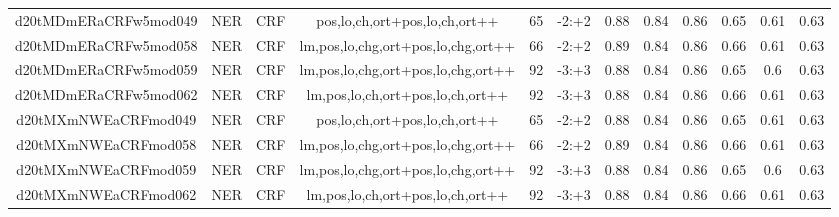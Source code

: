 \documentclass[a4paper]{article}
\begin{document}
\begin{landscape}
\begin{center}
\begin{tabular}{ |c|c|c|c|c|c|c|c|c|c|c|c|}
 	
 
 	
 		
 		\small{ d20tMDmERaCRFw5mod049 } & NER & CRF & pos,lo,ch,ort+pos,lo,ch,ort++  &  65 &  -2:+2  &  0.88 & 0.84 & 0.86  &  0.65 & 0.61 & 0.63 \\
 		

 	
 
 	
 		
 		\small{ d20tMDmERaCRFw5mod058 } & NER & CRF & lm,pos,lo,chg,ort+pos,lo,chg,ort++  &  66 &  -2:+2  &  0.89 & 0.84 & 0.86  &  0.66 & 0.61 & 0.63 \\
 		

 	
 
 	
 		
 		\small{ d20tMDmERaCRFw5mod059 } & NER & CRF & lm,pos,lo,chg,ort+pos,lo,chg,ort++  &  92 &  -3:+3  &  0.88 & 0.84 & 0.86  &  0.65 & 0.6 & 0.63 \\
 		

 	
 
 	
 		
 		\small{ d20tMDmERaCRFw5mod062 } & NER & CRF & lm,pos,lo,ch,ort+pos,lo,ch,ort++  &  92 &  -3:+3  &  0.88 & 0.84 & 0.86  &  0.66 & 0.61 & 0.63 \\
 		

 	
 
 	
 		
 		\small{ d20tMXmNWEaCRFmod049 } & NER & CRF & pos,lo,ch,ort+pos,lo,ch,ort++  &  65 &  -2:+2  &  0.88 & 0.84 & 0.86  &  0.65 & 0.61 & 0.63 \\
 		

 	
 
 	
 		
 		\small{ d20tMXmNWEaCRFmod058 } & NER & CRF & lm,pos,lo,chg,ort+pos,lo,chg,ort++  &  66 &  -2:+2  &  0.89 & 0.84 & 0.86  &  0.66 & 0.61 & 0.63 \\
 		

 	
 
 	
 		
 		\small{ d20tMXmNWEaCRFmod059 } & NER & CRF & lm,pos,lo,chg,ort+pos,lo,chg,ort++  &  92 &  -3:+3  &  0.88 & 0.84 & 0.86  &  0.65 & 0.6 & 0.63 \\
 		

 	
 
 	
 		
 		\small{ d20tMXmNWEaCRFmod062 } & NER & CRF & lm,pos,lo,ch,ort+pos,lo,ch,ort++  &  92 &  -3:+3  &  0.88 & 0.84 & 0.86  &  0.66 & 0.61 & 0.63 \\
 		

 	
 

\end{tabular}
\end{center}
\end{landscape}
\end{document}
